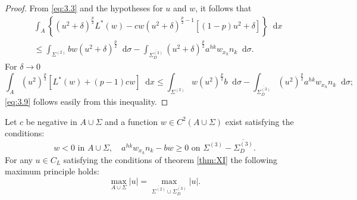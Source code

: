 \documentclass[a4paper,12pt,leqno]{article}
\numberwithin{equation}{section}
\newenvironment{thm}[1]
{\renewcommand\theinnerproblem{#1}\innerproblem}
{\endinnerproblem}
\newcommand{\dd}{\mathop{}\!\mathrm{d}}
\newcommand{\ovdir}{\overline{\Sigma_{D}^{(3)}}}
\begin{document}
\begin{proof}
	From \eqref{eq:3.3} and the hypotheses for $u$ and $w$, it follows that
	\begin{equation*}
		\begin{aligned}
			&\int_{A}\left\{\left(u^{2}+\delta\right)^{\frac{p}{2}} L^{*}(w)-c w\left(u^{2}+\delta\right)^{\frac{p}{2}-1}\left[(1-p) u^{2}+\delta\right]\right\} \dd x \\
			&\leq \int_{\Sigma^{(2)}} b w\left(u^{2}+\delta\right)^{\frac{p}{2}} \dd \sigma-\int_{\ovdir}\left(u^{2}+\delta\right)^{\frac{p}{2}} a^{h k} w_{x_{h}} n_{k} \dd \sigma.
		\end{aligned}
	\end{equation*}
	For $\delta \rightarrow 0$
	\begin{equation*}
		\int_{A}\left(u^{2}\right)^{\frac{p}{2}}\left[L^{*}(w)+(p-1) c w\right] \dd x \leq \int_{\Sigma^{(2)}} w\left(u^{2}\right)^{\frac{p}{2}} b \dd \sigma-\int_{\ovdir}\left(u^{2}\right)^{\frac{p}{2}} a^{h k} w_{x_h} n_{k} \dd \sigma ;
	\end{equation*}
	\eqref{eq:3.9} follows easily from this inequality.
\end{proof}

\begin{thm}{XII}
	Let $c$ be negative in $A \cup \Sigma$ and a function $w \in C^{2}(A \cup \Sigma)$ exist satisfying the conditions:
	\begin{equation*}
		w<0 \text{ in } A \cup \Sigma, \quad 
		a^{h k} w_{x_{h}} n_{k}-b w \geq 0 \text{ on } \Sigma^{(3)}-\ovdir.
	\end{equation*}
	For any $u \in C_{L}$ satisfying the conditions of theorem \ref{thm:XI} the following maximum principle holds:
	\begin{equation}
		\label{eq:3.10}
		\boxed{
		\max_{A\cup\Sigma} |u|=\max_{\overline{\Sigma^{(2)}} \cup \ovdir} |u|.}
	\end{equation}
\end{thm}
\end{document}

